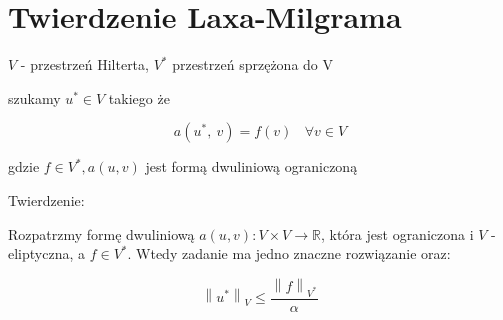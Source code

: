 \section{Twierdzenie Laxa-Milgrama}

$V$ - przestrzeń Hilterta, $V^*$ przestrzeń sprzężona do V

szukamy $u^* \in V$ takiego że

\[a(u^*,\ v) = f(v)\ \ \ \ \forall v \in V\]

gdzie $f \in V^*, a(u,v)$ jest formą dwuliniową ograniczoną

Twierdzenie:

Rozpatrzmy formę dwuliniową $a(u, v): V \times V \rightarrow \mathbb{R}$, która jest ograniczona i $V$ -eliptyczna, a $f \in V^*$. Wtedy zadanie ma jedno znaczne rozwiązanie oraz:

\[ \left \| u^* \right \|_V \leqslant \frac{\left \| f \right \|_{V^*}} {\alpha} \]